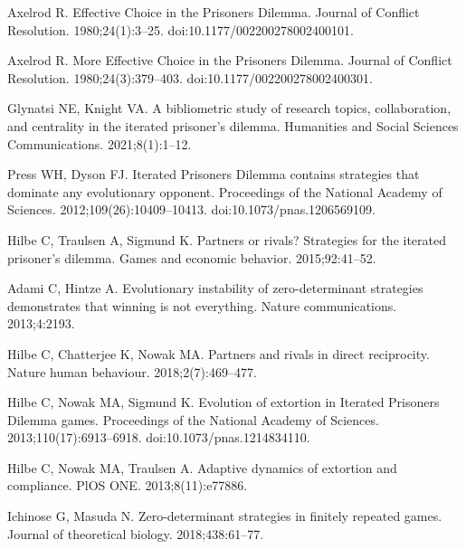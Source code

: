 \documentclass[10pt,letterpaper]{article}
\begin{document}
\begin{thebibliography}{10}

Axelrod R.
\newblock Effective Choice in the Prisoner{\textquotesingle}s Dilemma.
\newblock Journal of Conflict Resolution. 1980;24(1):3--25.
\newblock doi:{10.1177/002200278002400101}.

Axelrod R.
\newblock More Effective Choice in the Prisoner{\textquotesingle}s Dilemma.
\newblock Journal of Conflict Resolution. 1980;24(3):379--403.
\newblock doi:{10.1177/002200278002400301}.

Glynatsi NE, Knight VA.
\newblock A bibliometric study of research topics, collaboration, and
  centrality in the iterated prisoner’s dilemma.
\newblock Humanities and Social Sciences Communications. 2021;8(1):1--12.

Press WH, Dyson FJ.
\newblock Iterated Prisoner{\textquotesingle}s Dilemma contains strategies that
  dominate any evolutionary opponent.
\newblock Proceedings of the National Academy of Sciences.
  2012;109(26):10409--10413.
\newblock doi:{10.1073/pnas.1206569109}.

Hilbe C, Traulsen A, Sigmund K.
\newblock Partners or rivals? Strategies for the iterated prisoner's dilemma.
\newblock Games and economic behavior. 2015;92:41--52.

Adami C, Hintze A.
\newblock Evolutionary instability of zero-determinant strategies demonstrates
  that winning is not everything.
\newblock Nature communications. 2013;4:2193.

Hilbe C, Chatterjee K, Nowak MA.
\newblock Partners and rivals in direct reciprocity.
\newblock Nature human behaviour. 2018;2(7):469--477.

Hilbe C, Nowak MA, Sigmund K.
\newblock Evolution of extortion in Iterated Prisoner{\textquotesingle}s
  Dilemma games.
\newblock Proceedings of the National Academy of Sciences.
  2013;110(17):6913--6918.
\newblock doi:{10.1073/pnas.1214834110}.

Hilbe C, Nowak MA, Traulsen A.
\newblock Adaptive dynamics of extortion and compliance.
\newblock PlOS ONE. 2013;8(11):e77886.

Ichinose G, Masuda N.
\newblock Zero-determinant strategies in finitely repeated games.
\newblock Journal of theoretical biology. 2018;438:61--77.


\end{thebibliography}
\end{document}

